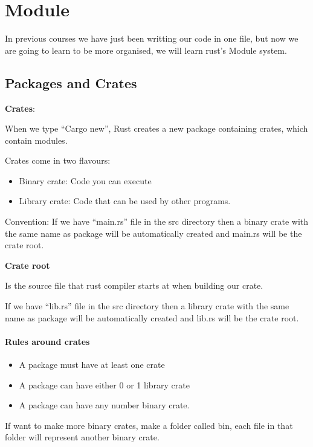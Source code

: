 \section{Module}
In previous courses we have just been writting our code in one file, but now we are going to learn to be more organised, we will learn rust's Module system.
\subsection{Packages and Crates}
\begin{definition}
    \textbf{Crates}:

    When we type ``Cargo new'', Rust creates a new package containing crates, which contain modules.

    Crates come in two flavours:\begin{itemize}
        \item Binary crate: Code you can execute
        \item Library crate: Code that can be used by other programs.
    \end{itemize}
\end{definition}

Convention:
If we have ``main.rs'' file in the src directory then a binary crate with the same name as package will be automatically created and main.rs will be the crate root.

\begin{definition}
    \textbf{Crate root}

    Is the source file that rust compiler starts at when building our crate.
\end{definition}

If we have ``lib.rs'' file in the src directory then a library crate with the same name as package will be automatically created and lib.rs will be the crate root.

\paragraph*{Rules around crates}
\begin{itemize}
    \item A package must have at least one crate
    \item A package can have either 0 or 1 library crate
    \item A package can have any number binary crate.
\end{itemize}

If want to make more binary crates, make a folder called bin, each file in that folder will represent another binary crate.


